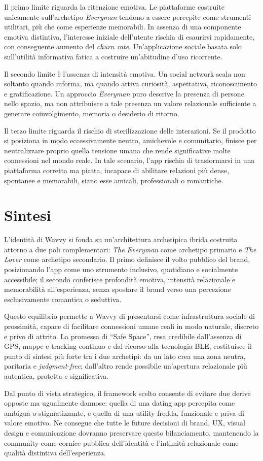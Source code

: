 \documentclass[a4paper, 11pt, table, dvipsnames]{article}
\begin{document}
Il primo limite riguarda la ritenzione emotiva. Le piattaforme
costruite unicamente sull'archetipo \textit{Everyman}
tendono a essere percepite come strumenti utilitari, più che
come esperienze memorabili. In assenza di una componente
emotiva distintiva, l'interesse iniziale dell'utente rischia
di esaurirsi rapidamente, con conseguente aumento del
\textit{churn rate}. Un'applicazione sociale basata solo
sull'utilità informativa fatica a costruire un'abitudine d'uso
ricorrente.

Il secondo limite è l'assenza di intensità emotiva. Un social
network scala non soltanto quando informa, ma quando
attiva curiosità, aspettativa, riconoscimento e
gratificazione. Un approccio \textit{Everyman} puro
descrive la presenza di persone nello spazio, ma non attribuisce
a tale presenza un valore relazionale sufficiente a generare
coinvolgimento, memoria o desiderio di ritorno.

Il terzo limite riguarda il rischio di sterilizzazione
delle interazioni. Se il prodotto si posiziona in modo eccessivamente
neutro, amichevole e comunitario, finisce per neutralizzare
proprio quella tensione umana che rende significative molte
connessioni nel mondo reale. In tale scenario, l'app rischia
di trasformarsi in una piattaforma corretta ma piatta,
incapace di abilitare relazioni più dense, spontanee e memorabili,
siano esse amicali, professionali o romantiche.

\section{Sintesi}

L'identità di Wavvy si fonda su un'architettura
archetipica ibrida costruita attorno a due poli
complementari: \textit{The Everyman} come archetipo
primario e \textit{The Lover} come archetipo secondario.
Il primo definisce il volto pubblico del brand, posizionando
l'app come uno strumento inclusivo, quotidiano e
socialmente accessibile; il secondo conferisce profondità emotiva,
intensità relazionale e memorabilità all'esperienza, senza
spostare il brand verso una percezione esclusivamente romantica
o seduttiva.

Questo equilibrio permette a Wavvy di presentarsi come infrastruttura
sociale di prossimità, capace di facilitare connessioni
umane reali in modo naturale, discreto e privo di attrito.
La promessa di \enquote{Safe Space}, resa credibile dall'assenza
di GPS, mappe e tracking continuo e dal ricorso alla tecnologia
BLE, costituisce il punto di sintesi più forte tra i due
archetipi: da un lato crea una zona neutra, paritaria e
\textit{judgment-free}; dall'altro rende possibile un'apertura
relazionale più autentica, protetta e significativa.

Dal punto di vista strategico, il framework scelto
consente di evitare due derive opposte ma ugualmente
dannose: quella di una dating app percepita come ambigua o
stigmatizzante, e quella di una utility fredda, funzionale
e priva di valore emotivo. Ne consegue che tutte le future
decisioni di brand, UX, visual design e comunicazione
dovranno preservare questo bilanciamento, mantenendo la community
come cornice pubblica dell'identità e l'intimità relazionale
come qualità distintiva dell'esperienza.
\end{document}
